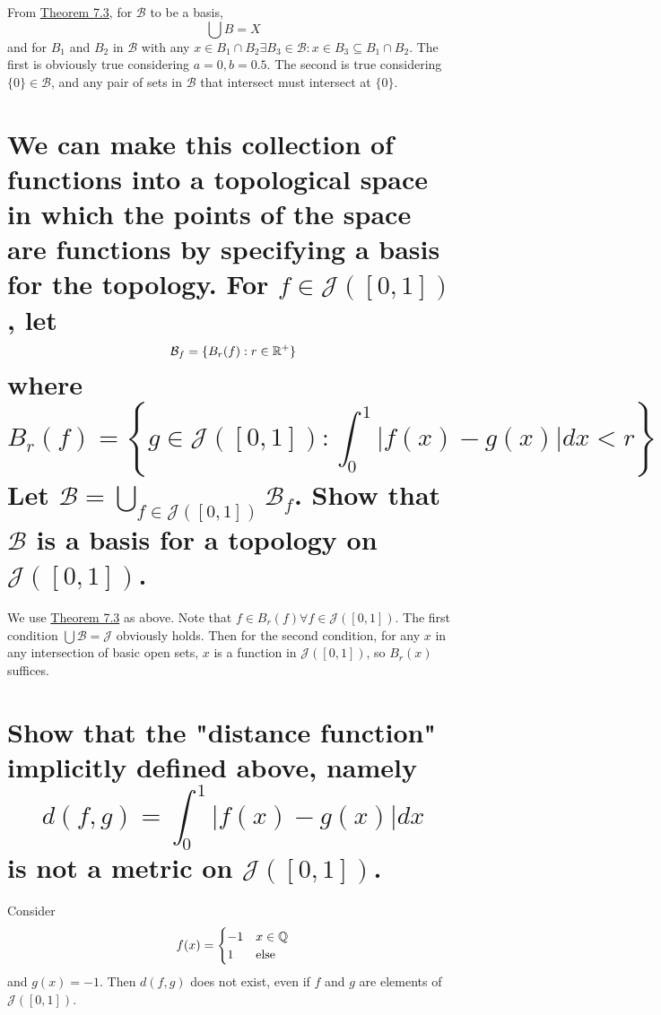 \begin{solution}
From \hyperref[thm4.7.3]{Theorem 7.3}, for $\mathcal{B}$ to be a basis,
$$\bigcup B = X$$
and for $B_1$ and $B_2$ in $\mathcal{B}$ with any $x \in B_1 \cap B_2 \exists B_3 \in \mathcal{B}: x \in B_3 \subseteq B_1 \cap B_2$. The first is obviously true considering $a = 0, b = 0.5$. The second is true considering $\{0\} \in \mathcal{B}$, and any pair of sets in $\mathcal{B}$ that intersect must intersect at $\{0\}$.
\end{solution}


\begin{parts}
\part{We can make this collection of functions into a topological space in which the points of the space are functions by specifying a basis for the topology. For $f \in \mathcal{J}([0,1])$, let $$\mathcal{B}_f = \{B_r(f): r \in \mathbb{R}^+\}$$ where $$B_r(f) = \left\{g\in \mathcal{J}([0,1]): \int_0^1 |f(x) - g(x)|dx < r\right\}$$ Let $\mathcal{B} = \bigcup_{f \in \mathcal{J}([0,1])} \mathcal{B}_f$. Show that $\mathcal{B}$ is a basis for a topology on $\mathcal{J}([0,1])$.}\label{q4.7.7.3a}

\begin{solution}
We use \hyperref[thm4.7.3]{Theorem 7.3} as above. Note that
$f \in B_r(f) \forall f \in \mathcal{J}([0,1])$. The first condition $\bigcup \mathcal{B} = \mathcal{J}$ obviously holds. Then for the second condition, for any $x$ in any intersection of basic open sets, $x$ is a function in $\mathcal{J}([0,1])$, so $B_r(x)$ suffices.
\end{solution}

\part{Show that the "distance function" implicitly defined above, namely $$d(f,g) = \int_0^1 |f(x)-g(x)|dx$$ is not a metric on $\mathcal{J}([0,1])$.}

\begin{solution}
Consider $$f(x) = \begin{cases} -1 & x \in \mathbb{Q} \\ 1 & \text{else}\end{cases}$$ and $g(x) = -1$. Then $d(f,g)$ does not exist, even if $f$ and $g$ are elements of $\mathcal{J}([0,1])$.
\end{solution}

\end{parts}

